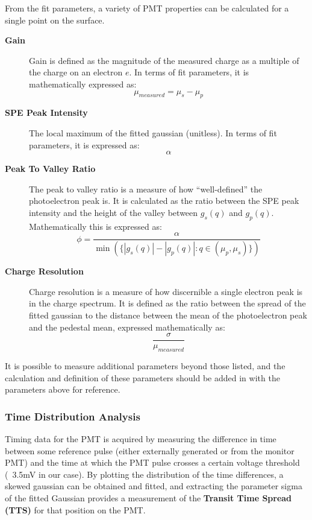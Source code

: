 \documentclass[twoside,letterpaper]{refart}
\begin{document}
From the fit parameters, a variety of PMT properties can be calculated for a single point on the surface.

\begin{description}
	\item[\textbf{Gain}] Gain is defined as the magnitude of the measured charge as a multiple of the charge on an electron $e$. In terms of fit parameters, it is mathematically expressed as: \[\mu_{measured} = \mu_s - \mu_p \]
	\item[\textbf{SPE Peak Intensity}] The local maximum of the fitted gaussian (unitless). In terms of fit parameters, it is expressed as: \[ \alpha \]
	\item[\textbf{Peak To Valley Ratio}] The peak to valley ratio is a measure of how ``well-defined'' the photoelectron peak is. It is calculated as the ratio between the SPE peak intensity and the height of the valley between $g_s(q)$ and $g_p(q)$. Mathematically this is expressed as: \[\phi = \frac{\alpha}{\min(\{|g_s(q)| - |g_p(q)|: q \in (\mu_p, \mu_s)\})} \]
	\item[\textbf{Charge Resolution}] Charge resolution is a measure of how discernible a single electron peak is in the charge spectrum. It is defined as the ratio between the spread of the fitted gaussian to the distance between the mean of the photoelectron peak and the pedestal mean, expressed mathematically as: \[\frac{\sigma}{\mu_{measured}}\]

\end{description}

It is possible to measure additional parameters beyond those listed, and the calculation and definition of these parameters should be added in with the parameters above for reference.


\subsubsection{Time Distribution Analysis}

Timing data for the PMT is acquired by measuring the difference in time between some reference pulse (either externally generated or from the monitor PMT) and the time at which the PMT pulse crosses a certain voltage threshold (~3.5mV in our case). By plotting the distribution of the time differences, a skewed gaussian can be obtained and fitted, and extracting the parameter sigma of the fitted Gaussian provides a measurement of the \textbf{Transit Time Spread (TTS)} for that position on the PMT.
\end{document}

